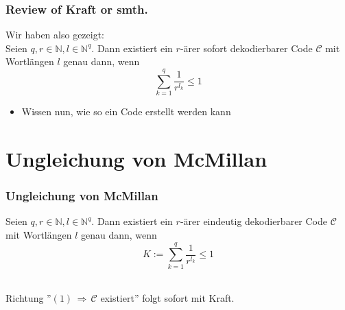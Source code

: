 \documentclass{beamer}
\begin{document}
\begin{frame}[t]
{{\begin{center}
            \end{center}
        }
    }
\end{frame}

\begin{frame}[t]
    \frametitle{Review of Kraft or smth.}
    Wir haben also gezeigt:\\[5pt]
    Seien $q,r \in \mathbb{N}, l \in \mathbb{N}^q$. Dann existiert ein $r$-ärer sofort dekodierbarer Code $\mathcal{C}$
    mit Wortlängen $l$ genau dann, wenn
    $$
        \sum_{k=1}^{q} \frac{1}{r^{l_k}} \leq 1
    $$
    \begin{itemize}
        \item Wissen nun, wie so ein Code erstellt werden kann
    \end{itemize}
\end{frame}


\section{Ungleichung von McMillan}

\begin{frame}[t]
    \frametitle{Ungleichung von McMillan}
    Seien $q,r \in \mathbb{N}, l \in \mathbb{N}^q$. Dann existiert ein $r$-ärer eindeutig dekodierbarer Code $\mathcal{C}$
    mit Wortlängen $l$ genau dann, wenn
    \begin{equation}
        K := \sum_{k=1}^{q} \frac{1}{r^{l_k}} \leq 1
    \end{equation}\\[20pt]
    \pause

    Richtung ''$(1) \,\Longrightarrow\, \mathcal{C}$ existiert'' folgt sofort mit Kraft.\\
\end{frame}
\end{document}
